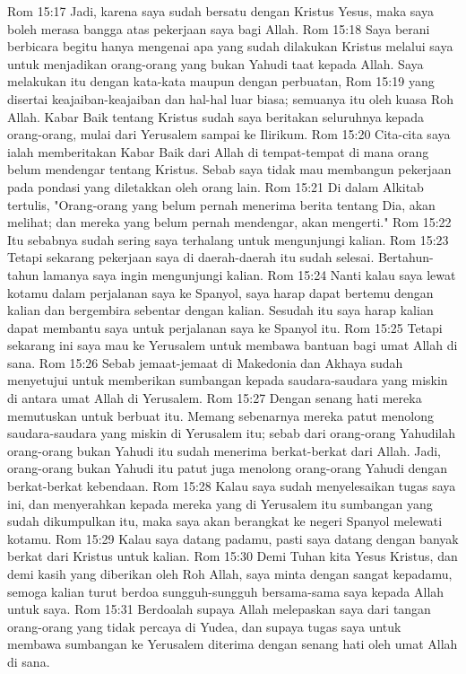 Rom 15:17  Jadi, karena saya sudah bersatu dengan Kristus Yesus, maka saya boleh merasa bangga atas pekerjaan saya bagi Allah.
Rom 15:18  Saya berani berbicara begitu hanya mengenai apa yang sudah dilakukan Kristus melalui saya untuk menjadikan orang-orang yang bukan Yahudi taat kepada Allah. Saya melakukan itu dengan kata-kata maupun dengan perbuatan,
Rom 15:19  yang disertai keajaiban-keajaiban dan hal-hal luar biasa; semuanya itu oleh kuasa Roh Allah. Kabar Baik tentang Kristus sudah saya beritakan seluruhnya kepada orang-orang, mulai dari Yerusalem sampai ke Ilirikum.
Rom 15:20  Cita-cita saya ialah memberitakan Kabar Baik dari Allah di tempat-tempat di mana orang belum mendengar tentang Kristus. Sebab saya tidak mau membangun pekerjaan pada pondasi yang diletakkan oleh orang lain.
Rom 15:21  Di dalam Alkitab tertulis, "Orang-orang yang belum pernah menerima berita tentang Dia, akan melihat; dan mereka yang belum pernah mendengar, akan mengerti."
Rom 15:22  Itu sebabnya sudah sering saya terhalang untuk mengunjungi kalian.
Rom 15:23  Tetapi sekarang pekerjaan saya di daerah-daerah itu sudah selesai. Bertahun-tahun lamanya saya ingin mengunjungi kalian.
Rom 15:24  Nanti kalau saya lewat kotamu dalam perjalanan saya ke Spanyol, saya harap dapat bertemu dengan kalian dan bergembira sebentar dengan kalian. Sesudah itu saya harap kalian dapat membantu saya untuk perjalanan saya ke Spanyol itu.
Rom 15:25  Tetapi sekarang ini saya mau ke Yerusalem untuk membawa bantuan bagi umat Allah di sana.
Rom 15:26  Sebab jemaat-jemaat di Makedonia dan Akhaya sudah menyetujui untuk memberikan sumbangan kepada saudara-saudara yang miskin di antara umat Allah di Yerusalem.
Rom 15:27  Dengan senang hati mereka memutuskan untuk berbuat itu. Memang sebenarnya mereka patut menolong saudara-saudara yang miskin di Yerusalem itu; sebab dari orang-orang Yahudilah orang-orang bukan Yahudi itu sudah menerima berkat-berkat dari Allah. Jadi, orang-orang bukan Yahudi itu patut juga menolong orang-orang Yahudi dengan berkat-berkat kebendaan.
Rom 15:28  Kalau saya sudah menyelesaikan tugas saya ini, dan menyerahkan kepada mereka yang di Yerusalem itu sumbangan yang sudah dikumpulkan itu, maka saya akan berangkat ke negeri Spanyol melewati kotamu.
Rom 15:29  Kalau saya datang padamu, pasti saya datang dengan banyak berkat dari Kristus untuk kalian.
Rom 15:30  Demi Tuhan kita Yesus Kristus, dan demi kasih yang diberikan oleh Roh Allah, saya minta dengan sangat kepadamu, semoga kalian turut berdoa sungguh-sungguh bersama-sama saya kepada Allah untuk saya.
Rom 15:31  Berdoalah supaya Allah melepaskan saya dari tangan orang-orang yang tidak percaya di Yudea, dan supaya tugas saya untuk membawa sumbangan ke Yerusalem diterima dengan senang hati oleh umat Allah di sana.
